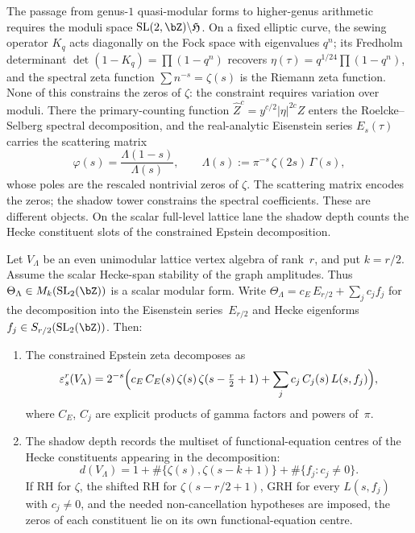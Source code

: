 The passage from genus-$1$ quasi-modular forms to higher-genus
arithmetic requires the moduli space
$\mathrm{SL}(2,\bZ)\backslash\mathfrak{H}$. On a fixed elliptic
curve, the sewing operator $K_q$ acts diagonally on the Fock space
with eigenvalues $q^n$; its Fredholm determinant
$\det(1-K_q) = \prod(1-q^n)$ recovers
$\eta(\tau) = q^{1/24}\prod(1-q^n)$, and the spectral zeta
function $\sum n^{-s} = \zeta(s)$ is the Riemann zeta function.
None of this constrains the zeros of $\zeta$: the constraint
requires variation over moduli. There the primary-counting
function
$\widehat{Z}^c = y^{c/2}\lvert\eta\rvert^{2c} Z$ enters the
Roelcke--Selberg spectral decomposition, and the real-analytic
Eisenstein series $E_s(\tau)$ carries the scattering matrix
\begin{equation}\label{eq:scattering-matrix}
 \varphi(s) = \frac{\Lambda(1-s)}{\Lambda(s)},
 \qquad
 \Lambda(s) := \pi^{-s}\,\zeta(2s)\,\Gamma(s),
\end{equation}
whose poles are the rescaled nontrivial zeros of $\zeta$.
The scattering matrix encodes the zeros; the shadow tower
constrains the spectral coefficients. These are different objects.
On the scalar full-level lattice lane the shadow depth counts
the Hecke constituent slots of the constrained Epstein decomposition.

\begin{theorem}
\label{thm:shadow-spectral-correspondence}
\ClaimStatusProvedHere
Let $V_\Lambda$ be an even unimodular lattice vertex algebra of
rank~$r$, and put $k=r/2$. Assume the scalar Hecke-span stability of
the graph amplitudes. Thus
$\Theta_\Lambda\in M_k(\mathrm{SL}_2(\bZ))$ is a scalar modular form.
Write
$\Theta_\Lambda = c_E\, E_{r/2} + \sum_j c_j f_j$ for the
decomposition into the Eisenstein series~$E_{r/2}$ and Hecke
eigenforms $f_j\in S_{r/2}(\mathrm{SL}_2(\bZ))$. Then:
\begin{enumerate}[label=\textup{(\roman*)}]
\item The constrained Epstein zeta decomposes as
\begin{equation}\label{eq:epstein-factorization}
 \varepsilon^r_s(V_\Lambda)
 = 2^{-s}\Bigl(
 c_E\,C_E(s)\,\zeta(s)\,\zeta(s-\tfrac{r}{2}+1)
 + \sum_j c_j\,C_j(s)\,L(s,f_j)
 \Bigr),
\end{equation}
where $C_E$, $C_j$ are explicit products of gamma factors and powers
of~$\pi$.
\item The shadow depth records the multiset of
functional-equation centres of the Hecke constituents appearing in
the decomposition:
\[
 d(V_\Lambda)
 =
 1+\#\{\zeta(s),\zeta(s-k+1)\}
   +\#\{f_j:c_j\ne0\}.
\]
If RH for $\zeta$, the shifted RH for
$\zeta(s-r/2+1)$, GRH for every $L(s,f_j)$ with $c_j\ne0$, and the
needed non-cancellation hypotheses are imposed, the zeros of each
constituent lie on its own functional-equation centre.
\end{enumerate}
\end{theorem}

